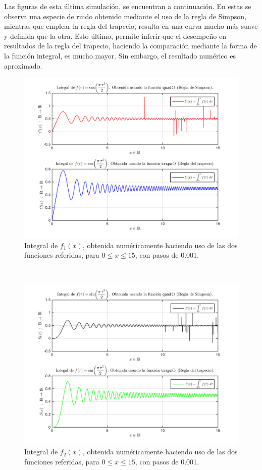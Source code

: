 \documentclass[11pt, spanish]{article}
\begin{document}
Las figuras de esta última simulación, se encuentran a continuación. En estas se observa una especie de ruido obtenido mediante el uso de la regla de Simpson, mientras que emplear la regla del trapecio, resulta en una curva mucho más suave y definida que la otra. Esto último, permite inferir que el desempeño en resultados de la regla del trapecio, haciendo la comparación mediante la forma de la función integral, es mucho mayor. Sin embargo, el resultado numérico es aproximado.

\begin{figure}[H]
\centering
	\includegraphics[scale=0.6]{data/img/f1intplot0001}
	\caption{Integral de $f_1(x)$, obtenida numéricamente haciendo uso de las dos funciones referidas, para $0 \leq x \leq 15$, con pasos de 0.001.}
\end{figure}\

\begin{figure}[H]
\centering
	\includegraphics[scale=0.6]{data/img/f2intplot0001}
	\caption{Integral de $f_2(x)$, obtenida numéricamente haciendo uso de las dos funciones referidas, para $0 \leq x \leq 15$, con pasos de 0.001.}
\end{figure}\
\end{document}
